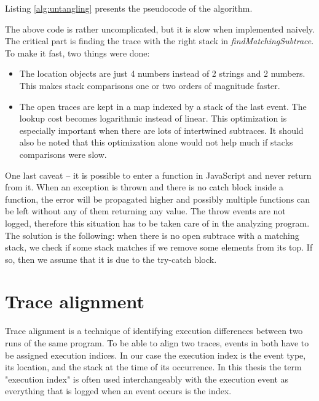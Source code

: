 Listing \ref{alg:untangling} presents the pseudocode of the algorithm.



The above code is rather uncomplicated, but it is slow when implemented naively.
The critical part is finding the trace with the right stack in \emph{findMatchingSubtrace}.
To make it fast, two things were done:
\begin{itemize}
  \item The location objects are just 4 numbers instead of 2 strings and 2 numbers. This makes stack comparisons
           one or two orders of magnitude faster.
  \item The open traces are kept in a map indexed by a stack of the last event. 
  			The lookup cost becomes logarithmic instead of linear. This optimization is especially important when there are lots
  			of intertwined subtraces. It should also be noted that this optimization alone
  			would not help much if stacks comparisons were slow.
\end{itemize} 

One last caveat -- it is possible to enter a function in JavaScript and never return from it.
When an exception is thrown and there is no catch block inside a function, the error will
be propagated higher and possibly multiple functions can be left without any of them returning any value.
The throw events are not logged, therefore this situation has to be taken care of
in the analyzing program. The solution is the following: when there is no open subtrace with a matching stack,
we check if some stack matches if we remove some elements from its top.
If so, then we assume that it is due to the try-catch block.


\section{Trace alignment}
\label{trace-alignment}

Trace alignment is a technique of identifying execution differences between two runs of the same program.
To be able to align two traces, events in both have to be assigned execution indices.
In our case the execution index is the event type, its location, and the stack at the time of its occurrence.
In this thesis the term "execution index" is often used interchangeably with the execution event as everything that is
logged when an event occurs is the index.

